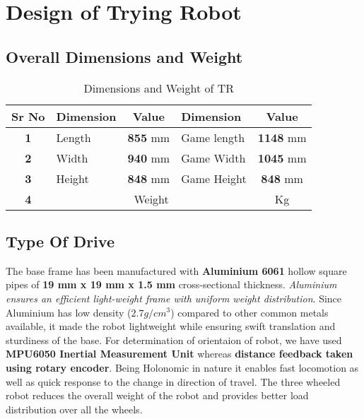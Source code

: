 \section{Design of Trying Robot}
    \subsection{Overall Dimensions and Weight}
        \begin{table}[h]
            \caption{Dimensions and Weight of TR} \label{Dimensions_TR} \small
            \begin{tabular}{|c|l|c|l|c|}
                \hline
                \textbf{Sr No}  & \textbf{Dimension} & \textbf{Value}  & \textbf{Dimension}      & \textbf{Value}   \\ \hline
                \textbf{1}      & Length             & \textbf{855} mm & Game length             & \textbf{1148} mm \\ \hline
                \textbf{2}      & Width              & \textbf{940} mm & Game Width              & \textbf{1045} mm \\ \hline
                \textbf{3}      & Height             & \textbf{848} mm & Game Height             & \textbf{848} mm  \\ \hline
                \textbf{4}      & \multicolumn{3}{c|}{Weight}                                    & \textbf{} Kg     \\ \hline
            \end{tabular}
        \end{table}

    \subsection{Type Of Drive}
        The base frame has been manufactured with \textbf{Aluminium 6061} hollow square pipes of \textbf{19 mm x 19 mm x 1.5 mm} cross-sectional thickness. 
        \textit{Aluminium ensures an efficient light-weight frame with uniform weight distribution}. Since Aluminium has low density ($2.7 g/cm^3$) compared 
        to other common metals available, it made the robot lightweight while ensuring swift translation and sturdiness of the base. For determination of orientaion 
        of robot, we have used \textbf{MPU6050 Inertial Measurement Unit} whereas \textbf{distance feedback taken using rotary encoder}. Being Holonomic 
        in nature it enables fast locomotion as well as quick response to the change in direction of travel. The three wheeled robot reduces the 
        overall weight of the robot and provides better load distribution over all the wheels.

